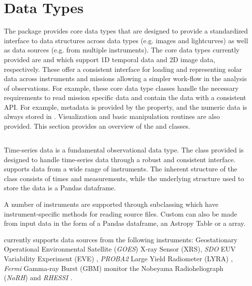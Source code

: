 \section{Data Types}
\label{sec:data_types}

The \sunpypkg package provides core data types that are designed to provide a standardized interface to data structures across data types (e.g. images and lightcurves) as well as data sources (e.g. from multiple instruments).
The core data types currently provided are \Timeseries and \Map which support 1D temporal data and 2D image data, respectively.
These offer a consistent interface for loading and representing solar data across instruments and missions allowing a simpler work-flow in the analysis of observations.
For example, these core data type classes handle the necessary requirements to read mission specific data and contain the data with a consistent API.
For example, metadata is provided by the  property, and the numeric data is always stored in .
Visualization and basic manipulation routines are also provided.
This section provides an overview of the \Timeseries and \Map classes.

\subsection{\Timeseries}
\label{sec:timeseries}
Time-series data is a fundamental observational data type.
The \Timeseries class provided is designed to handle time-series data through a robust and consistent interface.
\Timeseries supports data from a wide range of instruments.
The inherent structure of the \Timeseries class consists of times and measurements, while the underlying structure used to store the data is a Pandas dataframe.

A number of instruments are supported through subclassing which have instrument-specific methods for reading source files.
Custom \Timeseries can also be made from input data in the form of a Pandas dataframe, an Astropy Table or a \numpy array.

\Timeseries currently supports data sources from the following instruments:
Geostationary Operational Environmental Satellite (\textit{GOES}) X-ray Sensor (XRS),
\textit{SDO} EUV Variability Experiment (EVE) \citep{woods2010extreme},
\textit{PROBA2} Large Yield Radiometer (LYRA) \citep{dominique2013lyra},
\textit{Fermi} Gamma-ray Burst (GBM) monitor \citep{meegan2009fermi}
the Nobeyama Radioheliograph (\textit{NoRH}) \citep{nakajima1994nobeyama}
and \textit{RHESSI} \citep{lin2003reuven}.

